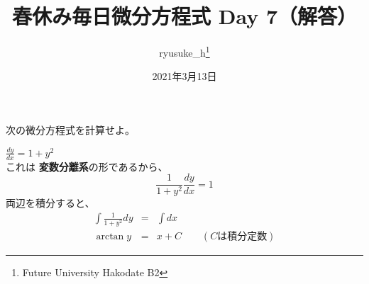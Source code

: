\documentclass[a4j]{jsarticle}
\title{春休み毎日微分方程式 Day 7（解答）}
\author{ryusuke\_h\thanks{Future University Hakodate B2}}
\date{2021年3月13日}
\begin{document}
\begin{spacing}{1.6}
\maketitle

次の微分方程式を計算せよ。
\begin{qparts}
    \qpart $ \displaystyle \frac{dy}{dx} = 1 + y ^ 2 $ \\
    これは {\bf 変数分離系}の形であるから、\\
    \begin{equation*}
      \frac{1}{1 + y ^ 2} \frac{dy}{dx} = 1
    \end{equation*}
    両辺を積分すると、\\
    \begin{eqnarray*}
      \int \frac{1}{1 + y ^ 2}dy & = & \int dx \\
      \arctan y & = & x + C \qquad (Cは積分定数)
    \end{eqnarray*}

    \newpage


\end{qparts}
\end{spacing}
\end{document}
